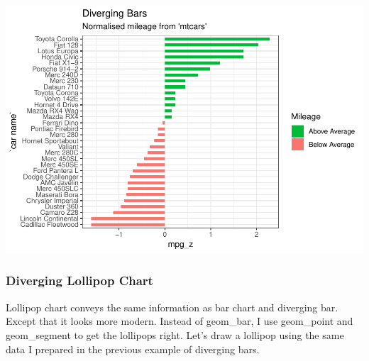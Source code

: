 \documentclass[a4paper]{article}
\begin{document}
\includegraphics{M24-ggplot2_Gallery_files/figure-latex/unnamed-chunk-12-1.pdf}
\newpage

\subsubsection{Diverging Lollipop Chart}\label{diverging-lollipop-chart}

Lollipop chart conveys the same information as bar chart and diverging
bar. Except that it looks more modern. Instead of geom\_bar, I use
geom\_point and geom\_segment to get the lollipops right. Let's draw a
lollipop using the same data I prepared in the previous example of
diverging bars.
\end{document}
